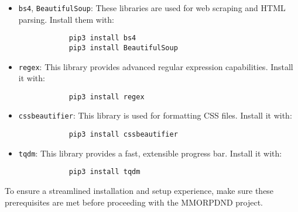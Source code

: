 \begin{itemize}
	\begin{itemize}
		\item \texttt{bs4}, \texttt{BeautifulSoup}: These libraries are used for web scraping and HTML parsing. Install them with:
		
		\begin{verbatim}
			pip3 install bs4
			pip3 install BeautifulSoup
		\end{verbatim}
		
		\item \texttt{regex}: This library provides advanced regular expression capabilities. Install it with:
		
		\begin{verbatim}
			pip3 install regex
		\end{verbatim}
		
		\item \texttt{cssbeautifier}: This library is used for formatting CSS files. Install it with:
		
		\begin{verbatim}
			pip3 install cssbeautifier
		\end{verbatim}
		
		\item \texttt{tqdm}: This library provides a fast, extensible progress bar. Install it with:
		
		\begin{verbatim}
			pip3 install tqdm
		\end{verbatim}
	\end{itemize}
\end{itemize}

To ensure a streamlined installation and setup experience, make sure these prerequisites are met before proceeding with the MMORPDND project.
